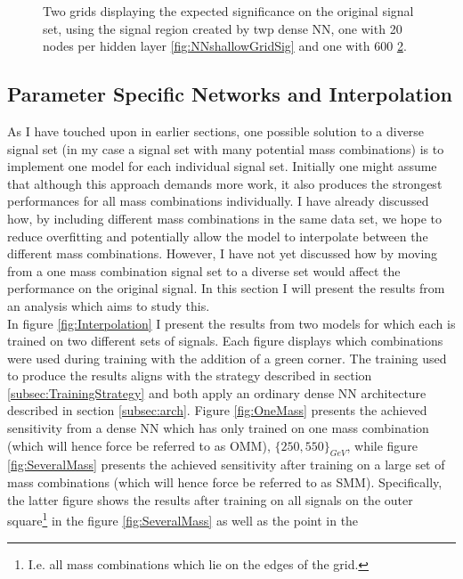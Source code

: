 \begin{figure}
{\begin{subfigure}{.6\textwidth}
        \vspace{-1.cm}
        \caption{}
        \label{fig:NNGridSig}
    \end{subfigure}
    }
    \caption{Two grids displaying the expected significance on the original signal set, using the signal region 
    created by twp dense \acs{NN}, one with 20 nodes per hidden layer \ref{fig:NNshallowGridSig} and one with 600 \ref{fig:NNGridSig}.}
\end{figure}
\subsection{Parameter Specific Networks and Interpolation}
As I have touched upon in earlier sections, one possible solution to a diverse signal set (in my case a signal set with many 
potential mass combinations) is to implement one model for each individual signal set. Initially one might assume that although 
this approach demands more work, it also produces the strongest performances for all mass combinations individually. I have already 
discussed how, by including different mass combinations in the same data set, we hope to reduce overfitting and potentially allow 
the model to interpolate between the different mass combinations. However, I have not yet discussed how by moving from a one 
mass combination signal set to a diverse set would affect the performance on the original signal. In this section I will present the 
results from an analysis which aims to study this.
\\
In figure \ref{fig:Interpolation} I present the results from two models for which each is trained on two different sets of signals.
Each figure displays which combinations were used during training with the addition of a green corner. 
The training used to produce the results aligns with the strategy described in section \ref{subsec:TrainingStrategy} and both apply
an ordinary dense \ac{NN} architecture described in section \ref{subsec:arch}. Figure \ref{fig:OneMass} presents the achieved sensitivity 
from a dense \ac{NN} which has only trained on one mass combination (which will hence force be referred to as \ac{OMM}), $\{250,550\}_{GeV}$, 
while figure \ref{fig:SeveralMass} presents the achieved sensitivity after training on a large set of mass combinations 
(which will hence force be referred to as \ac{SMM}). Specifically, the latter figure shows the results after training on all signals on the outer 
square\footnote{I.e. all mass combinations which lie on the edges of the grid.} in the figure \ref{fig:SeveralMass} as well as the point in the 
